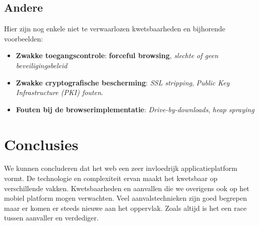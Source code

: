 \documentclass[../main.tex]{subfiles}
\begin{document}
\subsection{Andere}
Hier zijn nog enkele niet te verwaarlozen kwetsbaarheden en bijhorende voorbeelden:
\begin{itemize}
	\item \textbf{Zwakke toegangscontrole}: \textbf{forceful browsing}, \textit{slechte of geen beveiligingsbeleid}
	\item \textbf{Zwakke cryptografische bescherming}: \textit{SSL stripping}, \textit{Public Key Infrastructure (PKI) fouten}.
	\item \textbf{Fouten bij de browserimplementatie}: \textit{Drive-by-downloads}, \textit{heap spraying}
\end{itemize}

\section{Conclusies}
We kunnen concluderen dat het web een zeer invloedrijk applicatieplatform vormt. De technologie en complexiteit ervan maakt het kwetsbaar op verschillende vakken. Kwetsbaarheden en aanvallen die we overigens ook op het mobiel platform mogen verwachten. Veel aanvalstechnieken zijn goed begrepen maar er komen er steeds nieuwe aan het oppervlak. Zoals altijd is het een race tussen aanvaller en verdediger.
\end{document}
